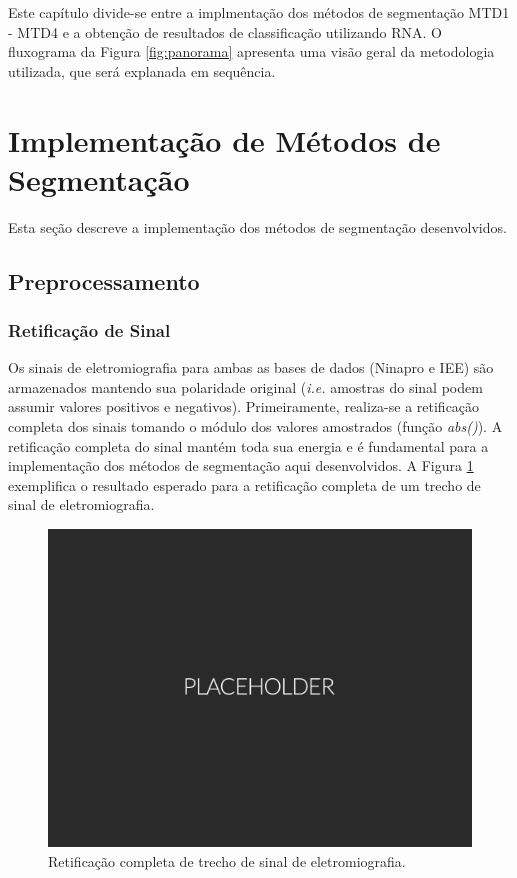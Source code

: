 Este capítulo divide-se entre a implmentação dos métodos de segmentação MTD1 - MTD4 e a obtenção de resultados de classificação utilizando RNA. O fluxograma da Figura \ref{fig:panorama} apresenta uma visão geral da metodologia utilizada, que será explanada em sequência.



\section{Implementação de Métodos de Segmentação}

Esta seção descreve a implementação dos métodos de segmentação desenvolvidos. 

\subsection {Preprocessamento}
\subsubsection{Retificação de Sinal}

Os sinais de eletromiografia para ambas as bases de dados (Ninapro e IEE) são armazenados mantendo sua polaridade original (\emph{i.e.} amostras do sinal podem assumir valores positivos e negativos). Primeiramente, realiza-se a retificação completa dos sinais tomando o módulo dos valores amostrados (função \emph{abs()}). A retificação completa do sinal mantém toda sua energia e é fundamental para a implementação dos métodos de segmentação aqui desenvolvidos. A Figura \ref{fig:rectification} exemplifica o resultado esperado para a retificação completa de um trecho de sinal de eletromiografia.

\begin{figure}[!htb]
	\label{fig:rectification}
	\caption{Retificação completa de trecho de sinal de eletromiografia.}
	\begin{center}
	    \includegraphics[width=0.75\linewidth]{./img/placeholder.png}
	\end{center}
\end{figure}


